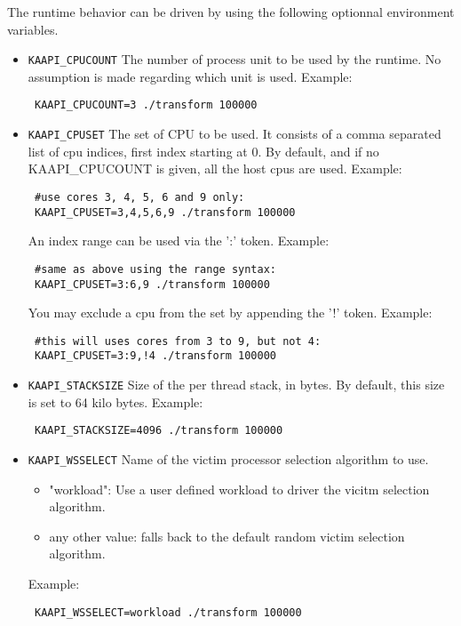\documentclass{article}
\begin{document}
The runtime behavior can be driven by using the following
optionnal environment variables.

\begin{itemize} %

\item \verb+KAAPI_CPUCOUNT+\newline
The number of process unit to be used by the runtime.
No assumption is made regarding which unit is used.
Example:
\begin{verbatim}
 KAAPI_CPUCOUNT=3 ./transform 100000
\end{verbatim}

\item \verb+KAAPI_CPUSET+\newline
The set of CPU to be used. It consists of a comma
separated list of cpu indices, first index starting
at 0. By default, and if no KAAPI\_CPUCOUNT is given,
all the host cpus are used.
Example:
\begin{verbatim}
 #use cores 3, 4, 5, 6 and 9 only:
 KAAPI_CPUSET=3,4,5,6,9 ./transform 100000
\end{verbatim}

An index range can be used via the ':' token.
Example:
\begin{verbatim}
 #same as above using the range syntax:
 KAAPI_CPUSET=3:6,9 ./transform 100000
\end{verbatim}

You may exclude a cpu from the set by appending the '!' token.
Example:
\begin{verbatim}
 #this will uses cores from 3 to 9, but not 4:
 KAAPI_CPUSET=3:9,!4 ./transform 100000
\end{verbatim}

\item \verb+KAAPI_STACKSIZE+\newline
Size of the per thread stack, in bytes. By default, this size
is set to 64 kilo bytes.
Example:
\begin{verbatim}
 KAAPI_STACKSIZE=4096 ./transform 100000
\end{verbatim}

\item \verb+KAAPI_WSSELECT+\newline
Name of the victim processor selection algorithm to use.
\begin{itemize}
\item "workload":
Use a user defined workload to driver the vicitm selection algorithm.
\item any other value: falls back to the default random victim selection
algorithm.
\end{itemize}
Example:
\begin{verbatim}
 KAAPI_WSSELECT=workload ./transform 100000
\end{verbatim}
\end{itemize} %
\end{document}
